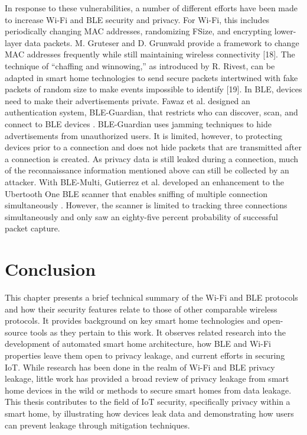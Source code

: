 \documentclass[12pt,letterpaper,oneside]{book}
\begin{document}
		In response to these vulnerabilities, a number of different efforts have been made to increase Wi-Fi and \ac{BLE} security and privacy. For Wi-Fi, this includes periodically changing MAC addresses, randomizing \ac{FSize}, and encrypting lower-layer data packets. M. Gruteser and D. Grunwald provide a framework to change MAC addresses frequently while still maintaining wireless connectivity [18]. The technique of “chaffing and winnowing,” as introduced by R. Rivest, can be adapted in smart home technologies to send secure packets intertwined with fake packets of random size to make events impossible to identify [19]. In \ac{BLE}, devices need to make their advertisements private. Fawaz et al. designed an authentication system, BLE-Guardian, that restricts who can discover, scan, and connect to \ac{BLE} devices \cite{Fawaz}. BLE-Guardian uses jamming techniques to hide advertisements from unauthorized users. It is limited, however, to protecting devices prior to a connection and does not hide packets that are transmitted after a connection is created. As privacy data is still leaked during a connection, much of the reconnaissance information mentioned above can still be collected by an attacker. With BLE-Multi, Gutierrez et al. developed an enhancement to the Ubertooth One \ac{BLE} scanner that enables sniffing of multiple connection simultaneously \cite{GutierrezMulti}. However, the scanner is limited to tracking three connections simultaneously and only saw an eighty-five percent probability of successful packet capture. 
		
		\section{Conclusion}
		This chapter presents a brief technical summary of the Wi-Fi and \ac{BLE} protocols and how their security features relate to those of other comparable wireless protocols. It provides background on key smart home technologies and open-source tools as they pertain to this work. It observes related research into the development of automated smart home architecture, how \ac{BLE} and Wi-Fi properties leave them open to privacy leakage, and current efforts in securing \ac{IoT}. While research has been done in the realm of Wi-Fi and \ac{BLE} privacy leakage, little work has provided a broad review of privacy leakage from smart home devices in the wild or methods to secure smart homes from data leakage. This thesis contributes to the field of \ac{IoT} security, specifically privacy within a smart home, by illustrating how devices leak data and demonstrating how users can prevent leakage through mitigation techniques.
		
		\backmatter
		\singlespace
		
		 
		\clearpage
\end{document}
